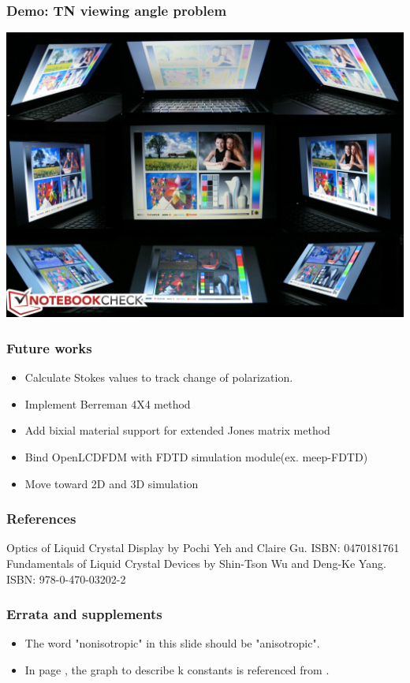 \documentclass{beamer}
\begin{document}
\begin{frame}
\frametitle{Demo: TN viewing angle problem}
\begin{center}
\includegraphics[scale=0.2]{TN_viewangle.jpg}
\end{center}
\end{frame}
\begin{frame}
\frametitle{Future works}
\begin{itemize}
\item Calculate Stokes values to track change of polarization.
\item Implement Berreman 4X4 method
\item Add bixial material support for extended Jones matrix method
\item Bind OpenLCDFDM with FDTD simulation module(ex. meep-FDTD)
\item Move toward 2D and 3D simulation
\end{itemize}
\end{frame}
\begin{frame}
\frametitle{References}
\begin{thebibliography}{0}
 Optics of Liquid Crystal Display by Pochi Yeh and Claire Gu. ISBN: 0470181761
 Fundamentals of Liquid Crystal Devices by Shin-Tson Wu and Deng-Ke Yang. ISBN: 978-0-470-03202-2
\end{thebibliography}
\end{frame}
\begin{frame}
\frametitle{Errata and supplements}
\begin{itemize}
\item The word "nonisotropic" in this slide should be "anisotropic".
\item In page \hyperlink{k_constants_graph}{}, the graph to describe k constants is referenced from \cite{Pochi}.
\end{itemize}
\end{frame}
\end{document}
